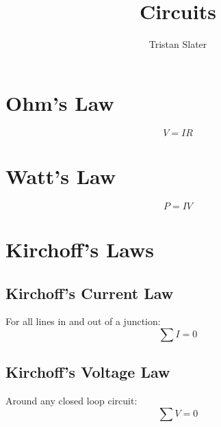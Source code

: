 \documentclass{article}
\title{Circuits}
\author{Tristan Slater}
\begin{document}
    \maketitle

    \section{Ohm's Law}

    \begin{equation}
        V = IR
    \end{equation}

    \section{Watt's Law}

    \begin{equation}
        P = IV
    \end{equation}

    \section{Kirchoff's Laws}

    \subsection{Kirchoff's Current Law}

    For all lines in and out of a junction: \begin{equation}
        \sum{I} = 0
    \end{equation}

    \subsection{Kirchoff's Voltage Law}

    Around any closed loop circuit: \begin{equation}
        \sum{V} = 0
    \end{equation}
\end{document}

